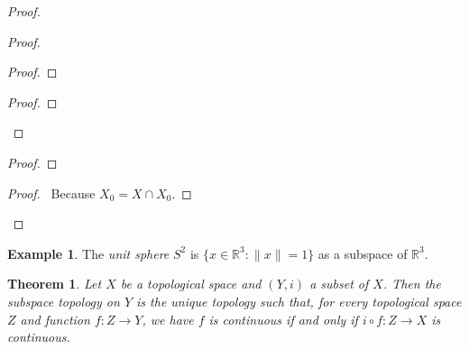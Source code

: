 \documentclass{book}
\let\qed\relax
\newtheorem{thm}[ax]{Theorem}
\theoremstyle{definition}
\newtheorem{ex}[ax]{Example}
\begin{document}
\begin{proof}
\pf
{}
\begin{proof}
	\begin{proof}
	\end{proof}
	\begin{proof}
	\end{proof}
\end{proof}
\begin{proof}
\end{proof}
\begin{proof}
	\pf\ Because $X_0 = X \cap X_0$.
\end{proof}
\qed
\end{proof}

\begin{ex}
The \emph{unit sphere} $S^2$ is $\{ x \in \mathbb{R}^3 : \| x \| = 1 \}$ as a subspace of $\mathbb{R}^3$.
\end{ex}

\begin{thm}
\label{thm:subspace_universal}
Let $X$ be a topological space and $(Y,i)$ a subset of $X$. Then the subspace topology on $Y$ is the unique topology such that, for every topological space $Z$ and function $f : Z \rightarrow Y$, we have $f$ is continuous if and only if $i \circ f : Z \rightarrow X$ is continuous.
\end{thm}
\end{document}
